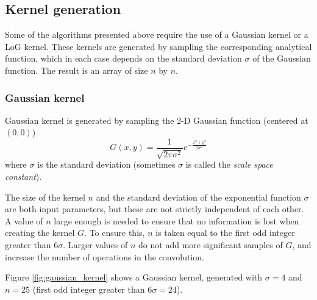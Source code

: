 \documentclass{ipol}
\numberwithin{equation}{section}
\numberwithin{table}{section}
\begin{document}

\subsection{Kernel generation}

Some of the algorithms presented above require the use of a Gaussian kernel or a LoG kernel. These 
kernels are generated by sampling the corresponding analytical function, which in each case depends 
on the standard deviation $\sigma$ of the Gaussian function. The result is an array of 
size $n$ by $n$.



\subsubsection{Gaussian kernel}

Gaussian kernel is generated by sampling the 2-D Gaussian function (centered at $(0,0)$)
\begin{equation}
	\label{eq:gaussian_function}
	G(x,y) = \frac{1}{\sqrt{2\pi\sigma^2}}e^{-\frac{x^2+y^2}{2\sigma^2}}
\end{equation}
where $\sigma$ is the standard deviation (sometimes $\sigma$ is called the \textit{scale space constant}).

The size of the kernel $n$ and the standard deviation of the exponential function $\sigma$ are both 
input parameters, but these are not strictly independent of each other. 
A value of $n$ large enough is needed to ensure that no information is lost when creating the kernel $G$. To ensure this, $n$ is taken equal to the first odd integer greater than $6\sigma$. Larger values of $n$ do not add more significant samples ​​of $G$, and increase the number of operations in the convolution.

Figure \ref{fig:gaussian_kernel} shows a Gaussian kernel, generated with $\sigma = 4$ and $n = 25$ 
(first odd integer greater than $6\sigma=24$).
\end{document}
